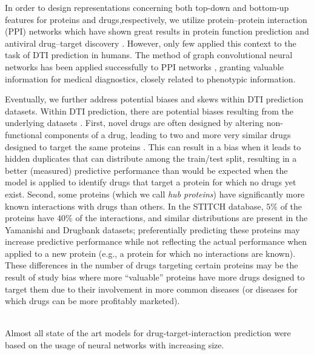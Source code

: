 \documentclass{bioinfo}
\renewcommand{\cite}{\citep}
\begin{document}
In order to design representations concerning both top-down and bottom-up features for proteins and drugs,respectively, we utilize protein--protein interaction (PPI) networks which have shown great results in protein function prediction \cite{Vazquez2003} and antiviral drug--target discovery \cite{Ackerman2019}. 
However, only few applied this context to the task of DTI prediction in humans. The method of graph convolutional neural networks has been applied successfully to PPI networks \cite{Zitnik2017}, granting valuable information for medical diagnostics, closely related to phenotypic information.

Eventually, we further address potential biases and skews within DTI prediction datasets. 
Within DTI prediction, there are potential biases resulting from the
underlying datasets \citep{Pahikkala2014}. First, novel drugs are
often designed by altering non-functional components of a drug,
leading to two and more very similar drugs designed to target the same
proteins \cite{Overington2006}. This can result in a bias when it
leads to hidden duplicates that can distribute among the train/test
split, resulting in a better (measured) predictive performance than
would be expected when the model is applied to identify drugs that
target a protein for which no drugs yet exist. Second, some proteins
(which we call \textit{hub proteins}) have significantly more known
interactions with drugs than others. In the STITCH database, $5\%$ of
the proteins have $40\%$ of the interactions, and similar
distributions are present in the Yamanishi and Drugbank
\cite{Drugbank2007, Drugbank2017} datasets; preferentially predicting
these proteins may increase predictive performance while not
reflecting the actual performance when applied to a new protein (e.g.,
a protein for which no interactions are known). These differences in
the number of drugs targeting certain proteins may be the result of
study bias where more ``valuable'' proteins have more drugs designed
to target them due to their involvement in more common diseases (or
diseases for which drugs can be more profitably marketed).

\cite{Survey2018}\\





Almost all state of the art models for drug-target-interaction
prediction were based on the usage of neural networks with increasing
size.
\end{document}
